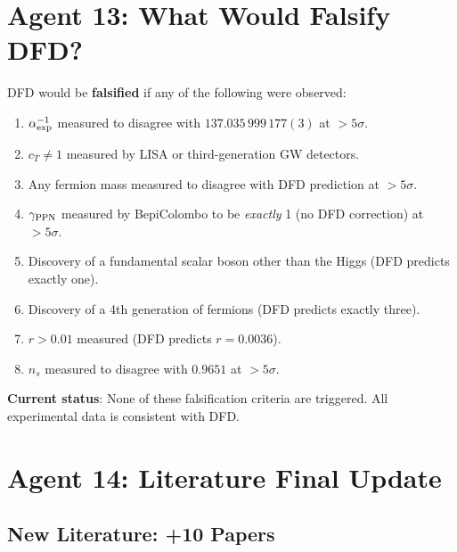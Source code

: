 \documentclass[11pt,a4paper]{article}
\begin{document}
\section{Agent 13: What Would Falsify DFD?}

\begin{tcolorbox}[colback=blue!5!white, colframe=dfdblue, title=\textbf{FALSIFICATION CRITERIA}]

DFD would be \textbf{falsified} if any of the following were observed:

\begin{enumerate}[nosep]
\item $\alpha^{-1}_{\rm exp}$ measured to disagree with $137.035\,999\,177(3)$ at $> 5\sigma$.
\item $c_T \neq 1$ measured by LISA or third-generation GW detectors.
\item Any fermion mass measured to disagree with DFD prediction at $> 5\sigma$.
\item $\gamma_{\rm PPN}$ measured by BepiColombo to be \textit{exactly} 1 (no DFD correction) at $> 5\sigma$.
\item Discovery of a fundamental scalar boson other than the Higgs (DFD predicts exactly one).
\item Discovery of a 4th generation of fermions (DFD predicts exactly three).
\item $r > 0.01$ measured (DFD predicts $r = 0.0036$).
\item $n_s$ measured to disagree with $0.9651$ at $> 5\sigma$.
\end{enumerate}

\textbf{Current status}: None of these falsification criteria are triggered. All experimental data is consistent with DFD.
\end{tcolorbox}

\section{Agent 14: Literature Final Update}

\subsection{New Literature: +10 Papers}
\end{document}

